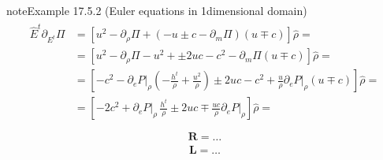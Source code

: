 \documentclass[letterpaper,10pt,english]{jupyterBook}
\begin{document}
\begin{sphinxadmonition}{note}{Example 17.5.2 (Euler equations in 1\sphinxhyphen{}dimensional domain)}
\begin{equation*}
\begin{split}\begin{aligned}
  \hat{E}^t \partial_{E^t} \Pi
  & = \left[  u^2 - \partial_\rho \Pi + ( -u \pm c -\partial_m \Pi ) (u \mp c) \right] \hat{\rho} = \\
  & = \left[  u^2 - \partial_\rho \Pi - u^2 + \pm 2 u c - c^2  -\partial_m \Pi (u \mp c) \right] \hat{\rho} = \\
  & = \left[ - c^2 - \partial_e P \big|_\rho \left( - \frac{h^t}{\rho} + \frac{u^2}{\rho} \right) \pm 2 u c - c^2  + \frac{u}{\rho} \partial_e P \big|_\rho (u \mp c) \right] \hat{\rho} = \\
  & = \left[ - 2 c^2 + \partial_e P \big|_\rho \, \frac{h^t}{\rho} \pm 2 u c  \mp  \frac{u c}{\rho} \partial_e P\big|_\rho \right] \hat{\rho} = \\
\end{aligned}\end{split}
\end{equation*}\begin{equation*}
\begin{split}\mathbf{R} = \dots \end{split}
\end{equation*}\begin{equation*}
\begin{split}\mathbf{L} = \dots \end{split}
\end{equation*}\end{sphinxadmonition}
\label{ch/pde/hyperbolic:example-6}
\end{document}
